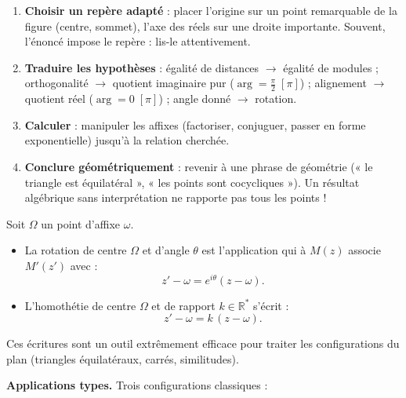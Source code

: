 \documentclass[11pt]{article}
\newcommand{\cle}[1]{{\popxbold\color{popdark}#1}}
\begin{document}
\begin{methode}
\begin{enumerate}
\item \textbf{Choisir un repère adapté} : placer l'origine sur un point remarquable de la figure (centre, sommet), l'axe des réels sur une droite importante. Souvent, l'énoncé impose le repère : lis-le attentivement.
\item \textbf{Traduire les hypothèses} : égalité de distances $\rightarrow$ égalité de modules ; orthogonalité $\rightarrow$ quotient imaginaire pur ($\arg = \frac{\pi}{2}\;[\pi]$) ; alignement $\rightarrow$ quotient réel ($\arg = 0\;[\pi]$) ; angle donné $\rightarrow$ rotation.
\item \textbf{Calculer} : manipuler les affixes (factoriser, conjuguer, passer en forme exponentielle) jusqu'à la relation cherchée.
\item \textbf{Conclure géométriquement} : revenir à une phrase de géométrie (« le triangle est équilatéral », « les points sont cocycliques »). Un résultat algébrique sans interprétation ne rapporte pas tous les points !
\end{enumerate}
\end{methode}

\begin{propriete}
Soit $\Omega$ un point d'affixe $\omega$.
\begin{itemize}
\item La \cle{rotation} de centre $\Omega$ et d'angle $\theta$ est l'application qui à $M(z)$ associe $M'(z')$ avec :
\[ z' - \omega = e^{i\theta}(z - \omega). \]
\item L'\cle{homothétie} de centre $\Omega$ et de rapport $k \in \mathbb{R}^*$ s'écrit :
\[ z' - \omega = k\,(z - \omega). \]
\end{itemize}
Ces écritures sont un outil extrêmement efficace pour traiter les configurations du plan (triangles équilatéraux, carrés, similitudes).
\end{propriete}

\textbf{Applications types.} Trois configurations classiques :
\end{document}
